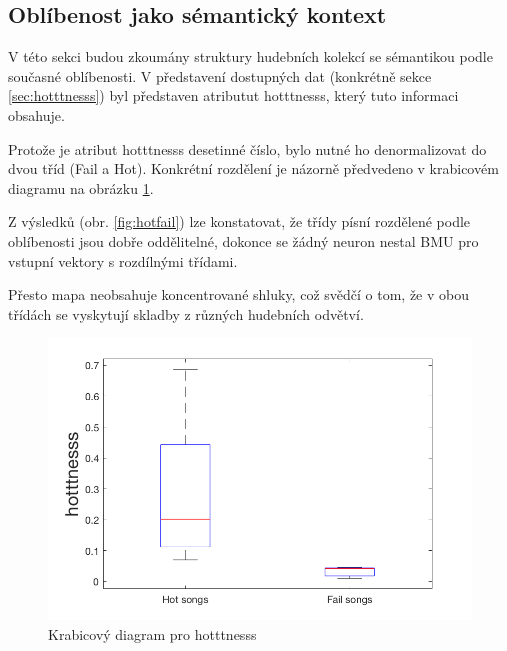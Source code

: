 \documentclass[thesis=M,czech]{FITthesis}[2012/06/26]
\begin{document}
\subsection{Oblíbenost jako sémantický kontext}\label{sec:hotness}
V této sekci budou zkoumány struktury hudebních kolekcí se sémantikou podle současné oblíbenosti. V představení dostupných dat (konkrétně sekce \ref{sec:hotttnesss}) byl představen atributut hotttnesss, který tuto informaci obsahuje.


Protože je atribut hotttnesss desetinné číslo, bylo nutné ho denormalizovat do dvou tříd (Fail a Hot). Konkrétní rozdělení je názorně předvedeno v krabicovém diagramu na obrázku \ref{fig:boxplot}.



Z výsledků (obr. \ref{fig:hotfail}) lze konstatovat, že třídy písní rozdělené podle oblíbenosti jsou dobře oddělitelné, dokonce se žádný neuron nestal BMU pro vstupní vektory s rozdílnými třídami.

Přesto mapa neobsahuje koncentrované shluky, což svědčí o tom, že v obou třídách se vyskytují skladby z různých hudebních odvětví.



\begin{figure}[htbp]
\begin{center}
	\includegraphics[scale=0.25]{exp_boxplot.png}
\caption{Krabicový diagram pro hotttnesss}
\label{fig:boxplot}
\end{center}
\end{figure}

  
\end{document}
